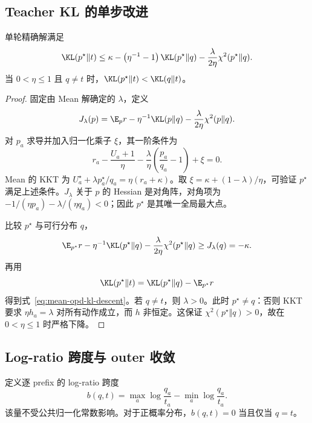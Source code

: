 \subsection{Teacher KL 的单步改进}

\begin{proposition}
\label{prop:mean-opd-kl-descent}
单轮精确解满足
\begin{equation}
 \KL(p^\star\Vert t)
 \le\kappa-\left(\eta^{-1}-1\right)\KL(p^\star\Vert q)
       -\frac{\lambda}{2\eta}\chi^2(p^\star\Vert q).
 \label{eq:mean-opd-kl-descent}
\end{equation}
当 $0<\eta\le1$ 且 $q\ne t$ 时，$\KL(p^\star\Vert t)<\KL(q\Vert t)$。
\end{proposition}

\begin{proof}
固定由 Mean 解确定的 $\lambda$，定义
\[
 J_\lambda(p)=\E_pr-\eta^{-1}\KL(p\Vert q)
                    -\frac{\lambda}{2\eta}\chi^2(p\Vert q).
\]
对 $p_a$ 求导并加入归一化乘子 $\xi$，其一阶条件为
\[
 r_a-\frac{U_a+1}{\eta}
 -\frac{\lambda}{\eta}\left(\frac{p_a}{q_a}-1\right)+\xi=0.
\]
Mean 的 KKT 为 $U_a^\star+\lambda p_a^\star/q_a=\eta(r_a+\kappa)$。取 $\xi=\kappa+(1-\lambda)/\eta$，可验证 $p^\star$ 满足上述条件。$J_\lambda$ 关于 $p$ 的 Hessian 是对角阵，对角项为 $-1/(\eta p_a)-\lambda/(\eta q_a)<0$；因此 $p^\star$ 是其唯一全局最大点。

比较 $p^\star$ 与可行分布 $q$，
\[
 \E_{p^\star}r-\eta^{-1}\KL(p^\star\Vert q)
 -\frac{\lambda}{2\eta}\chi^2(p^\star\Vert q)
 \ge J_\lambda(q)=-\kappa.
\]
再用
\[
 \KL(p^\star\Vert t)=\KL(p^\star\Vert q)-\E_{p^\star}r
\]
得到式~\eqref{eq:mean-opd-kl-descent}。若 $q\ne t$，则 $\lambda>0$。此时 $p^\star\ne q$：否则 KKT 要求 $\eta h_a=\lambda$ 对所有动作成立，而 $h$ 非恒定。这保证 $\chi^2(p^\star\Vert q)>0$，故在 $0<\eta\le1$ 时严格下降。
\end{proof}

\subsection{Log-ratio 跨度与 outer 收敛}

定义逐 prefix 的 log-ratio 跨度
\begin{equation}
 b(q,t)=\max_a\log\frac{q_a}{t_a}
        -\min_a\log\frac{q_a}{t_a}.
 \label{eq:mean-opd-span}
\end{equation}
该量不受公共归一化常数影响。对于正概率分布，$b(q,t)=0$ 当且仅当 $q=t$。

